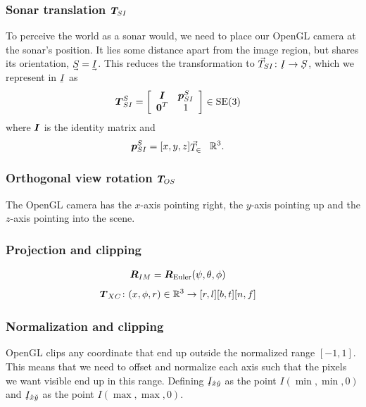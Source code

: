 \subsubsection{Sonar translation $\boldsymbol{T}_{\!SI}$}

To perceive the world as a sonar would, we need to place our OpenGL camera at the sonar's position. It lies some distance apart from the image region, but shares its orientation, $\uvec{S}=\uvec{I}$. This reduces the transformation to $\vec{T}_{SI}\colon \udot{I}\to\udot{S}$, which we represent in $\ubar{I}$ as
%
\begin{align}
\dvec{T}_{SI}^S &= 
\left[\begin{array}{c c}
 \mat{I}  & \dvec{p}_{SI}^S \\%
 \dvec{0}^T  &  1
\end{array}\right] \in \mathrm{SE}(3) \label{eq_T_SI}
\end{align}
%
where $\boldsymbol{I}$ is the identity matrix and 
%
\begin{align}
\dvec{p}_{SI}^S &= [x,y,z]\T \in \mathbb{R}^3.
\end{align}
%


\subsubsection{Orthogonal view rotation $\boldsymbol{T}_{\!OS}$}

The OpenGL camera has the $x$-axis pointing right, the $y$-axis pointing up and the $z$-axis pointing into the scene.  




\subsubsection{Projection and clipping}

\begin{align}
\dvec{R}_{IM} &= \dvec{R}_{\mathrm{Euler}}(\psi,\theta,\phi)\label{eq_R_IM}
\end{align}
\begin{align}
\boldsymbol{T}_{XC}&\colon (x,\phi,r)\in\mathbb{R}^3 \to [r,l][b,t][n,f]
\end{align}


\subsubsection{Normalization and clipping}

OpenGL clips any coordinate that end up outside the normalized range $[-1,1]$. This means that we need to offset and normalize each axis such that the pixels we want visible end up in this range.
Defining $\udot{I}_{\hat{x}\hat{y}}$ as the point $I(\min,\min,0)$ and $\udot{I}_{\check{x}\check{y}}$ as the point $I(\max,\max,0)$.

